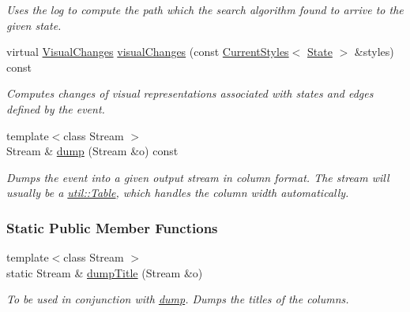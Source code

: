 \begin{DoxyCompactItemize}
\begin{DoxyCompactList}\small\item\em Uses the log to compute the path which the search algorithm found to arrive to the given state. \end{DoxyCompactList}\item 
virtual \hyperlink{structslb_1_1core_1_1ui_1_1EventBase_1_1VisualChanges}{Visual\+Changes} \hyperlink{structslb_1_1core_1_1ui_1_1EventBase_aa69b46193dcce78ad18003ca0c222566}{visual\+Changes} (const \hyperlink{structslb_1_1core_1_1ui_1_1CurrentStyles}{Current\+Styles}$<$ \hyperlink{structslb_1_1core_1_1ui_1_1EventBase_a2fe332d7f0fa68fe45a0b2e31c6790d1}{State} $>$ \&styles) const 
\begin{DoxyCompactList}\small\item\em Computes changes of visual representations associated with states and edges defined by the event. \end{DoxyCompactList}\item 
{\footnotesize template$<$class Stream $>$ }\\Stream \& \hyperlink{structslb_1_1core_1_1ui_1_1EventBase_a7c66eba76be0fb26ae508e04dd269f9c}{dump} (Stream \&o) const 
\begin{DoxyCompactList}\small\item\em Dumps the event into a given output stream in column format. The stream will usually be a \hyperlink{structslb_1_1core_1_1util_1_1Table}{util\+::\+Table}, which handles the column width automatically. \end{DoxyCompactList}\end{DoxyCompactItemize}
\subsubsection*{Static Public Member Functions}
\begin{DoxyCompactItemize}
\item 
{\footnotesize template$<$class Stream $>$ }\\static Stream \& \hyperlink{structslb_1_1core_1_1ui_1_1EventBase_af03180ec147799c8efd1eee5f747a583}{dump\+Title} (Stream \&o)
\begin{DoxyCompactList}\small\item\em To be used in conjunction with \hyperlink{structslb_1_1core_1_1ui_1_1EventBase_a7c66eba76be0fb26ae508e04dd269f9c}{dump}. Dumps the titles of the columns. \end{DoxyCompactList}\end{DoxyCompactItemize}
